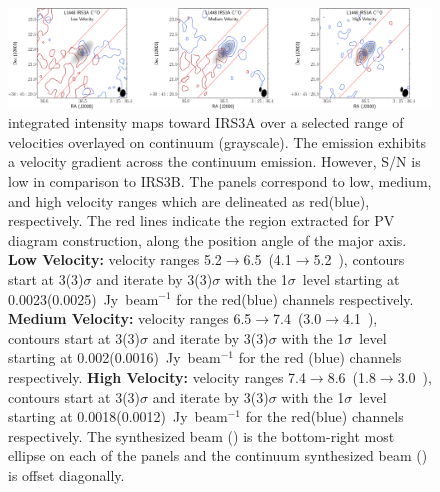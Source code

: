 \begin{figure}[H]
\begin{center}
   \includegraphics[width=1\textwidth]{img/L1448IRS3B_C17O_image_taper1500k__-irs3asplitMoments_irs3a_panel.pdf}  %
\end{center}
   \caption{\cso\space integrated intensity maps toward IRS3A over a selected range of velocities overlayed on continuum (grayscale). The \cso\space emission exhibits a velocity gradient across the continuum emission. However, S/N is low in comparison to IRS3B. The panels correspond to low, medium, and high velocity ranges which are delineated as red(blue), respectively. The red lines indicate the region extracted for PV diagram construction, along the position angle of the major axis. \textbf{Low Velocity:} velocity ranges 5.2$\rightarrow$6.5~\kms (4.1$\rightarrow$5.2~\kms), contours start at 3(3)$\sigma$ and iterate by 3(3)$\sigma$ with the 1$\sigma$~level starting at 0.0023(0.0025)~Jy~beam$^{-1}$ for the red(blue) channels respectively. \textbf{Medium Velocity:}  velocity ranges 6.5$\rightarrow$7.4~\kms (3.0$\rightarrow$4.1~\kms), contours start at 3(3)$\sigma$ and iterate by 3(3)$\sigma$ with the 1$\sigma$~level starting at 0.002(0.0016)~Jy~beam$^{-1}$ for the red (blue) channels respectively. \textbf{High Velocity:} velocity ranges 7.4$\rightarrow$8.6~\kms (1.8$\rightarrow$3.0~\kms), contours start at 3(3)$\sigma$ and iterate by 3(3)$\sigma$ with the 1$\sigma$~level starting at 0.0018(0.0012)~Jy~beam$^{-1}$ for the red(blue) channels respectively. The \cso\space synthesized beam (\csobeam) is the bottom-right most ellipse on each of the panels and the continuum synthesized beam (\contbeam) is offset diagonally.}\label{fig:irs3ac17omoment}
\end{figure}

